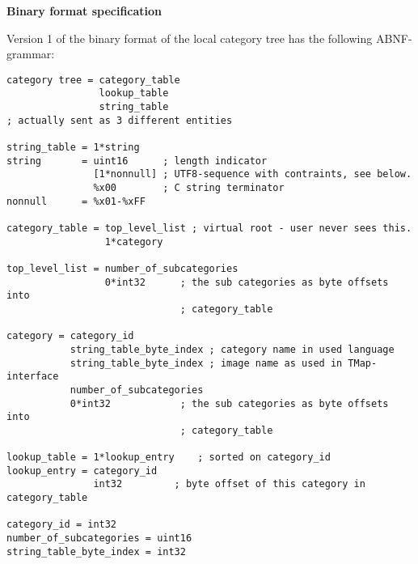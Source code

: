 %
% 
% 
% 
%
\textbf{Binary format specification}

Version 1 of the binary format of the local category tree has the following 
ABNF-grammar:

\begin{verbatim}
category tree = category_table
                lookup_table
                string_table
; actually sent as 3 different entities

string_table = 1*string
string       = uint16      ; length indicator
               [1*nonnull] ; UTF8-sequence with contraints, see below. 
               %x00        ; C string terminator
nonnull      = %x01-%xFF

category_table = top_level_list ; virtual root - user never sees this.
                 1*category

top_level_list = number_of_subcategories
                 0*int32      ; the sub categories as byte offsets into
                              ; category_table

category = category_id
           string_table_byte_index ; category name in used language
           string_table_byte_index ; image name as used in TMap-interface
           number_of_subcategories
           0*int32            ; the sub categories as byte offsets into
                              ; category_table

lookup_table = 1*lookup_entry    ; sorted on category_id
lookup_entry = category_id
               int32         ; byte offset of this category in category_table

category_id = int32
number_of_subcategories = uint16
string_table_byte_index = int32
\end{verbatim}

